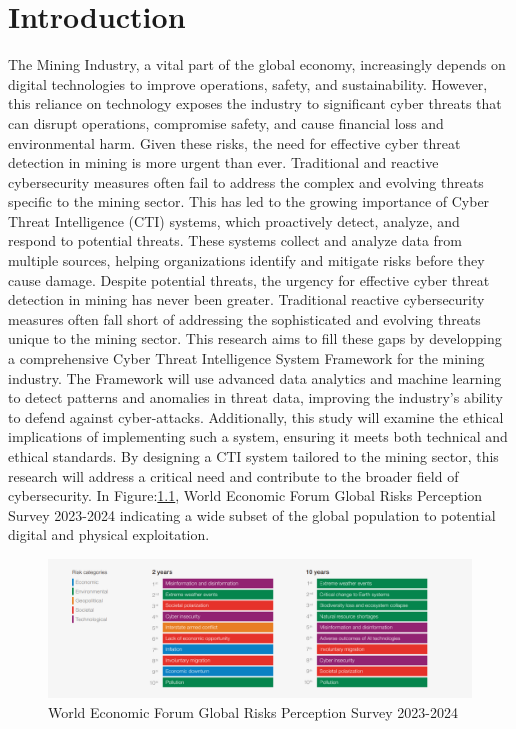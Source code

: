 \documentclass[a4paper,twoside,12pt]{report}
\begin{document}
\chapter{Introduction}
The Mining Industry, a vital part of the global economy, increasingly depends on digital technologies to improve operations, safety, and sustainability. However, this reliance on technology exposes the industry to significant cyber threats that can disrupt operations, compromise safety, and cause financial loss and environmental harm. Given these risks, the need for effective cyber threat detection in mining is more urgent than ever. Traditional and reactive cybersecurity measures often fail to address the complex and evolving threats specific to the mining sector. This has led to the growing importance of Cyber Threat Intelligence (CTI) systems, which proactively detect, analyze, and respond to potential threats. These systems collect and analyze data from multiple sources, helping organizations identify and mitigate risks before they cause damage. Despite potential threats, the urgency for effective cyber threat detection in mining has never been greater. Traditional reactive cybersecurity measures often fall short of addressing the sophisticated and evolving threats unique to the mining sector. This research aims to fill these gaps by developping a comprehensive Cyber Threat Intelligence System Framework for the mining industry. The Framework will use advanced data analytics and machine learning to detect patterns and anomalies in threat data, improving the industry’s ability to defend against cyber-attacks. Additionally, this study will examine the ethical implications of implementing such a system, ensuring it meets both technical and ethical standards. By designing a CTI system tailored to the mining sector, this research will address a critical need and contribute to the broader field of cybersecurity. In Figure:\ref{fig:thing1}, World Economic Forum Global Risks Perception Survey 2023-2024 indicating a wide subset of the global population to potential digital and physical exploitation.

\begin{figure}[ht]
    \centering
    \includegraphics[width=1.0\linewidth]{images/world-economic-forum-global-risks.png}  %
    \caption{World Economic Forum Global Risks Perception Survey 2023-2024}
    \label{fig:thing1}
\end{figure}
\end{document}
